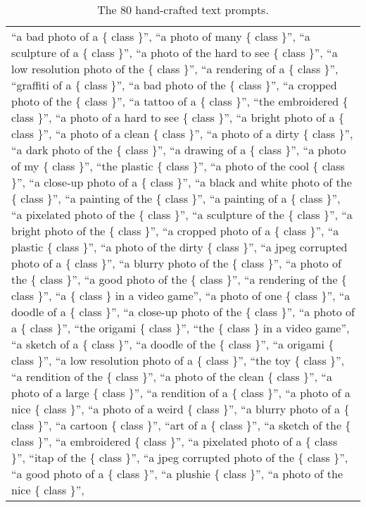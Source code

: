 \begin{table*}[t]
    \centering
    \caption{The 80 hand-crafted text prompts.}
    \label{tab:ensemble}
    \begin{tabularx}{\textwidth}{X}
        \hline
        ``a bad photo of a \{ class \}'', ``a photo of many \{ class \}'', ``a sculpture of a \{ class \}'', ``a photo of the hard to see \{ class \}'', 
        ``a low resolution photo of the \{ class \}'', ``a rendering of a \{ class \}'', ``graffiti of a \{ class \}'', ``a bad photo of the \{ class \}'', 
        ``a cropped photo of the \{ class \}'', ``a tattoo of a \{ class \}'', ``the embroidered \{ class \}'', ``a photo of a hard to see \{ class \}'', 
        ``a bright photo of a \{ class \}'', ``a photo of a clean \{ class \}'', ``a photo of a dirty \{ class \}'', ``a dark photo of the \{ class \}'', 
        ``a drawing of a \{ class \}'', ``a photo of my \{ class \}'', ``the plastic \{ class \}'', ``a photo of the cool \{ class \}'', 
        ``a close-up photo of a \{ class \}'', ``a black and white photo of the \{ class \}'', ``a painting of the \{ class \}'', ``a painting of a \{ class \}'', 
        ``a pixelated photo of the \{ class \}'', ``a sculpture of the \{ class \}'', ``a bright photo of the \{ class \}'', ``a cropped photo of a \{ class \}'', 
        ``a plastic \{ class \}'', ``a photo of the dirty \{ class \}'', ``a jpeg corrupted photo of a \{ class \}'', ``a blurry photo of the \{ class \}'', 
        ``a photo of the \{ class \}'', ``a good photo of the \{ class \}'', ``a rendering of the \{ class \}'', ``a \{ class \} in a video game'', 
        ``a photo of one \{ class \}'', ``a doodle of a \{ class \}'', ``a close-up photo of the \{ class \}'', ``a photo of a \{ class \}'', 
        ``the origami \{ class \}'', ``the \{ class \} in a video game'', ``a sketch of a \{ class \}'', ``a doodle of the \{ class \}'', 
        ``a origami \{ class \}'', ``a low resolution photo of a \{ class \}'', ``the toy \{ class \}'', ``a rendition of the \{ class \}'', 
        ``a photo of the clean \{ class \}'', ``a photo of a large \{ class \}'', ``a rendition of a \{ class \}'', ``a photo of a nice \{ class \}'', 
        ``a photo of a weird \{ class \}'', ``a blurry photo of a \{ class \}'', ``a cartoon \{ class \}'', ``art of a \{ class \}'', 
        ``a sketch of the \{ class \}'', ``a embroidered \{ class \}'', ``a pixelated photo of a \{ class \}'', ``itap of the \{ class \}'', 
        ``a jpeg corrupted photo of the \{ class \}'', ``a good photo of a \{ class \}'', ``a plushie \{ class \}'', ``a photo of the nice \{ class \}'', 

\end{tabularx}
\end{table*}
